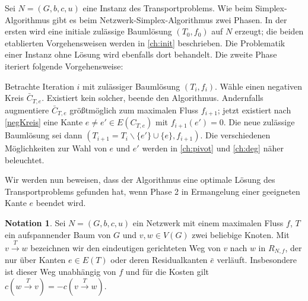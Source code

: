 \documentclass[a4paper,twoside,ngerman]{report}
\theoremstyle{plain}
\theoremstyle{definition}
\newtheorem*{nota}{Notation}
\begin{document}
Sei $N=(G,b,c,u)$ eine Instanz des Transportproblems. Wie beim Simplex-Algorithmus gibt es beim Netzwerk-Simplex-Algorithmus zwei Phasen. In der ersten wird eine initiale zulässige Baumlösung $(T_0,f_0)$ auf $N$ erzeugt; die beiden etablierten Vorgehensweisen werden in \cref{ch:init} beschrieben. Die Problematik einer Instanz ohne Lösung wird ebenfalls dort behandelt. Die zweite Phase iteriert folgende Vorgehensweise:

Betrachte Iteration $i$ mit zulässiger Baumlösung $(T_i,f_i)$. Wähle einen negativen Kreis $\bar{C}_{T,e}$. Existiert kein solcher, beende den Algorithmus. Andernfalls augmentiere $\bar{C}_{T,e}$ größtmöglich zum maximalen Fluss $f_{i+1}$; jetzt existiert nach \cref{negKreis} eine Kante $e\neq e'\in E(C_{T,e})$ mit $f_{i+1}(e')=0$. Die neue zulässige Baumlösung sei dann $(T_{i+1}=T_i\backslash\{e'\}\cup\{e\},f_{i+1})$. Die verschiedenen Möglichkeiten zur Wahl von $e$ und $e'$ werden in \cref{ch:pivot} und \cref{ch:deg} näher beleuchtet.

Wir werden nun beweisen, dass der Algorithmus eine optimale Lösung des Transportproblems gefunden hat, wenn Phase 2 in Ermangelung einer geeigneten Kante $e$ beendet wird.

\begin{nota}Sei $N=(G,b,c,u)$ ein Netzwerk mit einem maximalen Fluss $f$, $T$ ein aufspannender Baum von $G$ und $v,w\in V(G)$ zwei beliebige Knoten. Mit $v\xrightarrow{T}w$ bezeichnen wir den eindeutigen gerichteten Weg von $v$ nach $w$ in $R_{N,f}$, der nur über Kanten $e\in E(T)$ oder deren Residualkanten $\bar{e}$ verläuft. Insbesondere ist dieser Weg unabhängig von $f$ und für die Kosten gilt $c(w\xrightarrow{T}v) = -c(v\xrightarrow{T}w)$.\end{nota}
\end{document}
